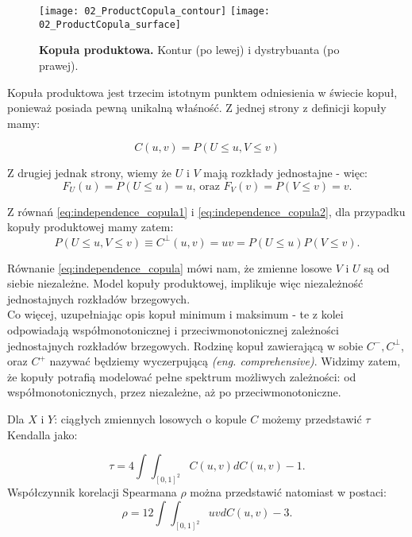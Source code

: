 \begin{figure}[h]
	\centering
	\texttt{[image: 02\_ProductCopula\_contour]}
	\texttt{[image: 02\_ProductCopula\_surface]}
	
	\caption{\textbf{Kopuła produktowa.} Kontur (po lewej) i dystrybuanta (po prawej). \label{fig:prod_copula}}
\end{figure}

Kopuła produktowa jest trzecim istotnym punktem odniesienia w świecie kopuł, ponieważ posiada pewną unikalną właśność. Z jednej strony z definicji kopuły mamy:

\begin{equation}
C(u, v) = P(U \leqslant u, V \leqslant v )
\label{eq:independence_copula1}
\end{equation}

Z drugiej jednak strony, wiemy że $U$ i $V$ mają rozkłady jednostajne - więc:
\begin{equation}
	F_U(u) = P(U \leqslant u) = u\text{, oraz } F_V(v) = P(V \leqslant v) = v.
\label{eq:independence_copula2}
\end{equation}

Z równań \ref{eq:independence_copula1} i \ref{eq:independence_copula2}, dla przypadku kopuły produktowej mamy zatem:
\begin{equation}
	P(U \leqslant u, V \leqslant v ) \equiv C^{\perp}(u, v) = uv = P(U \leqslant u) P(V \leqslant v).
	\label{eq:independence_copula}
\end{equation}

Równanie \ref{eq:independence_copula} mówi nam, że zmienne losowe $V$ i $U$ są od siebie niezależne. Model kopuły produktowej, implikuje więc niezależność jednostajnych rozkładów brzegowych.\\
Co więcej, uzupełniając opis kopuł minimum i maksimum - te z kolei odpowiadają współmonotonicznej i przeciwmonotonicznej zależności jednostajnych rozkładów brzegowych. Rodzinę kopuł zawierającą w sobie $C^{-}, C^{\perp}$, oraz $C^{+}$ nazywać będziemy wyczerpującą \emph{(eng. comprehensive)}. Widzimy zatem, że kopuły potrafią modelować pełne spektrum możliwych zależności: od współmonotonicznych, przez niezależne, aż po przeciwmonotoniczne.\\

\begin{prop}
	Dla $X$ i $Y$: ciągłych zmiennych losowych o kopule $C$ możemy przedstawić $\tau$ Kendalla jako:
	
	\begin{equation}
		\tau = 4\int\int_{[0, 1]^2}C(u,v)dC(u,v) -1.
		\label{eq:tau_from_copula}
	\end{equation}
	Współczynnik korelacji Spearmana $\rho$ można przedstawić natomiast w postaci:
	\begin{equation}	
		\rho = 12\int\int_{[0, 1]^2}uvdC(u,v) -3.
		\label{eq:rho_from_copula}
	\end{equation}
	\label{thm:tau_from_copula}
\end{prop}

